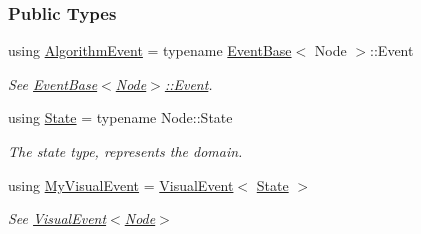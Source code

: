 \subsubsection*{Public Types}
\begin{DoxyCompactItemize}
\item 
using \hyperlink{structVisualLog_a90bc804c23c7d24b7857d8f79c46afbb}{Algorithm\+Event} = typename \hyperlink{structEventBase}{Event\+Base}$<$ Node $>$\+::Event\hypertarget{structVisualLog_a90bc804c23c7d24b7857d8f79c46afbb}{}\label{structVisualLog_a90bc804c23c7d24b7857d8f79c46afbb}

\begin{DoxyCompactList}\small\item\em See \hyperlink{structEventBase_a0ff1657dcfd85f6d094902d57e8f2af5}{Event\+Base$<$\+Node$>$\+::\+Event}. \end{DoxyCompactList}\item 
using \hyperlink{structVisualLog_a5453632aef6fcefb891c07b033fa6b6e}{State} = typename Node\+::\+State\hypertarget{structVisualLog_a5453632aef6fcefb891c07b033fa6b6e}{}\label{structVisualLog_a5453632aef6fcefb891c07b033fa6b6e}

\begin{DoxyCompactList}\small\item\em The state type, represents the domain. \end{DoxyCompactList}\item 
using \hyperlink{structVisualLog_a4becdb7d1f763e250a3ace276b111bcb}{My\+Visual\+Event} = \hyperlink{structVisualEvent}{Visual\+Event}$<$ \hyperlink{structVisualLog_a5453632aef6fcefb891c07b033fa6b6e}{State} $>$\hypertarget{structVisualLog_a4becdb7d1f763e250a3ace276b111bcb}{}\label{structVisualLog_a4becdb7d1f763e250a3ace276b111bcb}

\begin{DoxyCompactList}\small\item\em See \hyperlink{structVisualEvent}{Visual\+Event$<$\+Node$>$} \end{DoxyCompactList}\end{DoxyCompactItemize}
